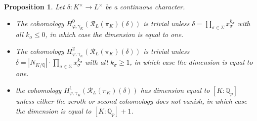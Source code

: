 \documentclass[12pt]{article}
\newtheorem{prop}[theorem]{Proposition}
\theoremstyle{definition}
\numberwithin{equation}{theorem}
\newcommand{\calR}{\mathcal{R}}
\newcommand{\QQ}{\mathbb{Q}}
\def\Qp{\QQ_p}
\begin{document}
\begin{prop}
\label{P:cohomology of rank one module}
Let $\delta: K^\times \to L^\times$ be a continuous character.
\begin{itemize}
\item[(1)] The cohomology $H^0_{\varphi, \gamma_K}(\calR_L(\pi_K)(\delta))$ is trivial unless $\delta = \prod_{\sigma \in \Sigma} x_\sigma^{k_\sigma}$ with all  $k_\sigma \leq 0$, in which case the dimension is equal to one.

\item[(2)] The cohomology
$H^2_{\varphi, \gamma_K}(\calR_L(\pi_K)(\delta))$ is trivial unless $\delta =|N_{K/\QQ}|\cdot  \prod_{\sigma \in \Sigma} x_\sigma^{k_\sigma}$ with all $k_\sigma \geq 1$, in which case the dimension is equal to one.

\item[(3)] the cohomology $H^1_{\varphi, \gamma_K}(\calR_L(\pi_K)(\delta))$ has dimension equal to $[K:\Qp]$ unless either the zeroth or second cohomology does not vanish, in which case the dimension is equal to $[K:\Qp]+1$.
\end{itemize}
\end{prop}
\end{document}
